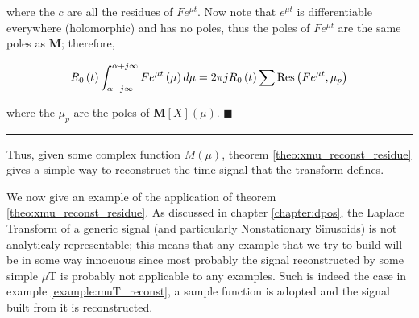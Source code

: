 	\noindent where the $c$ are all the residues of $Fe^{\mu t}$. Now note that $e^{\mu t}$ is differentiable everywhere (holomorphic) and has no poles, thus the poles of $Fe^{\mu t}$ are the same poles as $\mathbf{M}$; therefore,

\begin{equation} R_0\left(t\right)\int_{\alpha - j\infty}^{\alpha + j\infty} Fe^{\mu t}\left(\mu\right)d\mu = 2\pi j R_0\left(t\right)\sum \operatorname{Res}\left(Fe^{\mu t},\mu_p\right) \end{equation}

	\noindent where the $\mu_p$ are the poles of $\mathbf{M}\left[X\right]\left(\mu\right)$. \hfill$\blacksquare$\vspace{5mm}\hrule\vspace{5mm} %

	Thus, given some complex function $M\left(\mu\right)$, theorem \ref{theo:xmu_reconst_residue} gives a simple way to reconstruct the time signal that the transform defines.

	We now give an example of the application of theorem \ref{theo:xmu_reconst_residue}. As discussed in chapter \ref{chapter:dpos}, the Laplace Transform of a generic signal (and particularly Nonstationary Sinusoids) is not analyticaly representable; this means that any example that we try to build will be in some way innocuous since most probably the signal reconstructed by some simple $\mu$T is probably not applicable to any examples. Such is indeed the case in example \ref{example:muT_reconst}, a sample function is adopted and the signal built from it is reconstructed.

